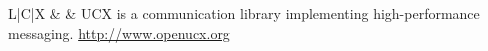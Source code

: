 \begin{tabularx}{\textwidth}{L{\firstColWidth{}}|C{\secondColWidth{}}|X}
 &
 &
UCX is a communication library implementing high-performance messaging.  { \color{logoblue} \url{http://www.openucx.org}}
\\ \hline

\bottomrule
\end{tabularx}

